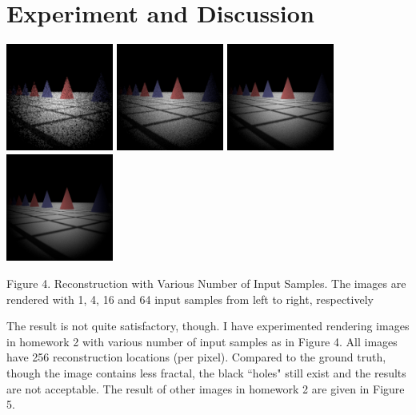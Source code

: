 \documentclass{article}
\begin{document}
\section{Experiment and Discussion}
\begin{center}
  \includegraphics[width=100pt,height=100pt]{./dof-dragons-dgauss-1-256-10-1-0.png}
  \includegraphics[width=100pt,height=100pt]{./dof-dragons-dgauss-4-256-10-1-0.png}
  \includegraphics[width=100pt,height=100pt]{./dof-dragons-dgauss-16-256-10-1-0.png}
  \includegraphics[width=100pt,height=100pt]{./dof-dragons-dgauss-64-256-10-1-0.png}

  \small{Figure 4. Reconstruction with Various Number of Input Samples. The images are rendered with  1, 4, 16 and 64 input samples from left to right, respectively}
\end{center}

The result is not quite satisfactory, though. I have experimented rendering images in homework 2 with various number of input samples as in Figure 4. All images have 256 reconstruction locations (per pixel). Compared to the ground truth, though the image contains less fractal, the black ``holes" still exist and the results are not acceptable. The result of other images in homework 2 are given in Figure 5.
\end{document}
